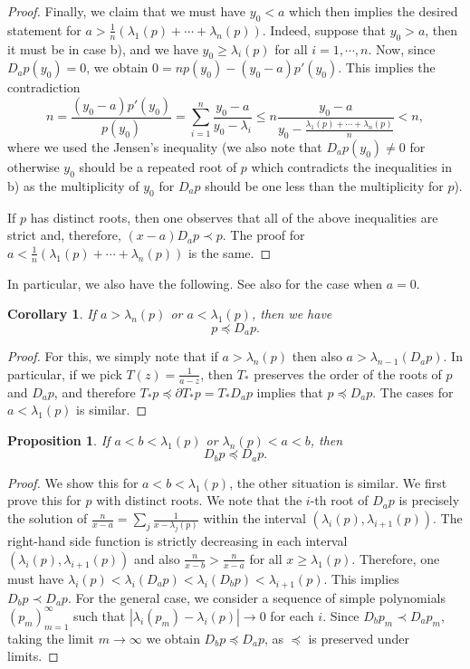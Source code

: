 \documentclass[reqno,11pt]{amsart}
\newtheorem{corollary}[theorem]{Corollary}
\newtheorem{proposition}[theorem]{Proposition}
\theoremstyle{remark}
\newcommand{\polar}[1]{D_{#1}}
\begin{document}
\begin{proof}
Finally, we claim that we must have $ y_0<a $ which then implies the desired statement for $ 
  a >\tfrac{1}{n}(\lambda_1(p)+\cdots +\lambda_n(p))$. Indeed, suppose that $y_0>a$, then it must be in case b), and we have $ y_0\geq \lambda_i(p) $ for all $i=1,\cdots,n$. Now, since $\polar{a}p(y_0) = 0$, we obtain $ 0=np(y_0)-(y_0-a)p'(y_0) $. This implies the contradiction
  $$n= \frac{(y_0-a)p'(y_0)}{p(y_0)} = \sum_{i=1}^n \frac{y_0-a}{y_0-\lambda_i} \leq n \frac{y_0 -a}{y_0 - \tfrac{\lambda_1(p)+\cdots +\lambda_n(p)}{n}} <n, $$
  where we used the Jensen's inequality (we also note that $\polar{a}p(y_0)\neq 0$ for otherwise $  y_0$ should be a repeated root of $p$ which contradicts the inequalities in b) as the multiplicity of $y_0$ for $\polar{a}p$ should be one less than the multiplicity for $p$).

  If $p$ has distinct roots, then one observes that all of the above inequalities are strict and, therefore, $ (x-a)\polar{a}p\prec p$. The proof for $ a <\tfrac{1}{n}(\lambda_1(p)+\cdots +\lambda_n(p)) $ is the same.
\end{proof}

In particular, we also have the following. See also \cite[Lemma 4.2]{fisk2006polynomials} for the case when $a=0$.
\begin{corollary}
    If $a> \lambda_n(p)$ or $a< \lambda_1(p)$, then we have
$$p\preccurlyeq \polar{a}p. $$
\end{corollary}
\begin{proof}
    For this, we simply note that if $ a >\lambda_n(p)$ then also $ a>\lambda_{n-1}(\polar{a}p) $. In particular, if we pick $ T(z) = \frac{1}{a-z} $, then $T_*$ preserves the order of the roots of $ p $ and $ \polar{a}p $, and therefore $ T_*p \preccurlyeq \partial T_*p =T_*\polar{a}p $ implies that $ p\preccurlyeq \polar{a}p $. The cases for $ a<\lambda_1(p) $ is similar.
\end{proof}


\begin{proposition}
\label{prop:polar.interlacing}
    If $a<b<\lambda_{1}(p)$ or $ \lambda_{n}(p)<a<b $, then
$$\polar{b}p\preccurlyeq \polar{a}p.$$
\end{proposition}
\begin{proof}
    We show this for $ a<b<\lambda_{1}(p)$, the other situation is similar. We first prove this for $p$ with distinct roots. We note that the $i$-th root of $\polar{a}p$ is precisely the solution of $\frac{n}{x-a}=\sum_j \frac{1}{x-\lambda_j(p)}$ within the interval $(\lambda_i(p),\lambda_{i+1}(p))$. The right-hand side function is strictly decreasing in each interval $ (\lambda_i(p),\lambda_{i+1}(p))$ and also $ \frac{n}{x-b}>\frac{n}{x-a} $ for all $x\geq\lambda_{1}(p)$. Therefore, one must have $ \lambda_{i}(p)<\lambda_{i}(\polar{a}p)<\lambda_{i}(\polar{b}p)<\lambda_{i+1}(p) $. This implies $ \polar{b}p\prec \polar{a}p $. For the general case, we consider a sequence of simple polynomials $(p_{m})_{m=1}^\infty$ such that $ |\lambda_i(p_m)-\lambda_i(p)|\to 0$ for each $i$. Since $ \polar{b}p_m\prec \polar{a}p_m $, taking the limit $m\to \infty$ we obtain $ \polar{b}p\preccurlyeq \polar{a}p $, as $ \preccurlyeq $ is preserved under limits.
\end{proof}
\end{document}
